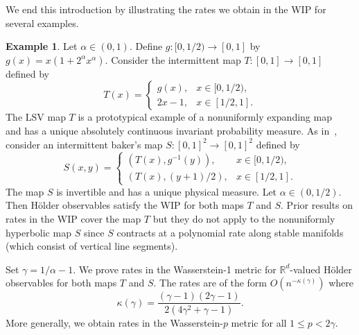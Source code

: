 \documentclass[11pt,a4paper,reqno,oneside]{amsart}
\newcommand{\R}{\ensuremath{\mathbb{R}}}%
\theoremstyle{definition}
\newtheorem{example}[theorem]{Example}
\theoremstyle{remark}
\numberwithin{equation}{section}
\begin{document}
We end this introduction by illustrating the rates we obtain in the WIP for several examples.
\begin{example}\label{exa:lsv_and_baker}
	Let $\alpha\in (0,1)$. Define $g:[0,1/2)\to [0,1]$ by $g(x) = x(1+2^\alpha x^\alpha)$. Consider the intermittent map $T:[0,1]\to [0,1]$ defined by 
	\[ 	T(x) = \begin{cases}
		g(x), & x \in [0,1/2),\\
		2x - 1, & x \in [1/2,1].
	\end{cases} \]
The LSV map $T$ is a prototypical example of a nonuniformly expanding map~\cite{lsvmaps} and has a unique absolutely continuous invariant probability measure. As in~\cite{melbourne_varandas_2016note}, consider an intermittent baker's map $S:[0,1]^2 \to [0,1]^2$ defined by 
\begin{equation*}
	S(x,y) = \begin{cases}
		(T(x),g^{-1}(y)), & x \in [0,1/2),\\
		(T(x),(y+1)/2), & x \in [1/2,1].
	\end{cases}
\end{equation*}
The map $S$ is invertible and has a unique physical measure. Let $\alpha\in (0,1/2)$. Then H\"older observables satisfy the WIP for both maps $T$ and $S$. Prior results on rates in the WIP cover the map $T$ but they do not apply to the nonuniformly hyperbolic map $S$ since $S$ contracts  at a polynomial rate along stable manifolds (which consist of vertical line segments). 

Set $\gamma = 1/\alpha-1$. We prove rates in the Wasserstein-1 metric for $\R^d$-valued H\"older observables for both maps $T$ and $S$. The rates are of the form $O(n^{-\kappa(\gamma)})$ where 
\[ \kappa(\gamma)= \frac{(\gamma-1)(2\gamma-1)}{2(4\gamma^2+\gamma-1)}. \]
More generally, we obtain rates in the Wasserstein-$p$ metric for all $1\le p< 2\gamma$. 


\end{example}
\end{document}
